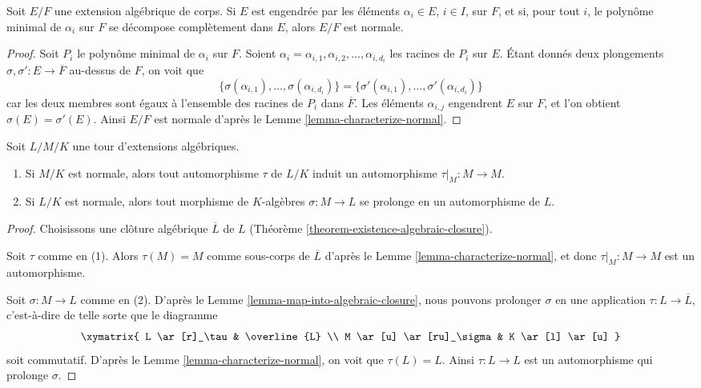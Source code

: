 \begin{lemma}
\label{lemma-normally-generated}
Soit $E/F$ une extension algébrique de corps.
Si $E$ est engendrée par les éléments $\alpha_i \in E$, $i \in I$,
sur $F$, et si, pour tout $i$, le polynôme minimal
de $\alpha_i$ sur $F$ se décompose complètement dans $E$, alors
$E/F$ est normale.
\end{lemma}

\begin{proof}
Soit $P_i$ le polynôme minimal de $\alpha_i$ sur $F$.
Soient $\alpha_i = \alpha_{i, 1}, \alpha_{i, 2}, \ldots, \alpha_{i, d_i}$
les racines de $P_i$ sur $E$. Étant donnés deux plongements
$\sigma, \sigma' : E \to \overline{F}$ au-dessus de $F$, on voit que
$$
\{\sigma(\alpha_{i, 1}), \ldots, \sigma(\alpha_{i, d_i})\} =
\{\sigma'(\alpha_{i, 1}), \ldots, \sigma'(\alpha_{i, d_i})\}
$$
car les deux membres sont égaux à l'ensemble des racines de $P_i$
dans $\overline{F}$. Les éléments $\alpha_{i, j}$
engendrent $E$ sur $F$, et l'on obtient $\sigma(E) = \sigma'(E)$.
Ainsi $E/F$ est normale d'après le Lemme \ref{lemma-characterize-normal}.
\end{proof}

\begin{lemma}
\label{lemma-lift-maps}
Soit $L/M/K$ une tour d'extensions algébriques.
\begin{enumerate}
\item Si $M/K$ est normale, alors tout automorphisme $\tau$ de $L/K$
induit un automorphisme $\tau|_M : M \to M$.
\item Si $L/K$ est normale, alors tout morphisme de $K$-algèbres $\sigma : M \to L$
se prolonge en un automorphisme de $L$.
\end{enumerate}
\end{lemma}

\begin{proof}
Choisissons une clôture algébrique $\overline{L}$ de $L$
(Théorème \ref{theorem-existence-algebraic-closure}).

\medskip\noindent
Soit $\tau$ comme en (1). Alors $\tau(M) = M$ comme sous-corps de $\overline{L}$
d'après le Lemme \ref{lemma-characterize-normal}, et donc
$\tau|_M : M \to M$ est un automorphisme.

\medskip\noindent
Soit $\sigma : M \to L$ comme en (2).
D'après le Lemme \ref{lemma-map-into-algebraic-closure},
nous pouvons prolonger $\sigma$ en une application
$\tau : L \to \overline{L}$, c'est-à-dire de telle sorte que le diagramme
$$
\xymatrix{
L \ar[r]_\tau & \overline{L} \\
M \ar[u] \ar[ru]_\sigma & K \ar[l] \ar[u]
}
$$
soit commutatif. D'après le Lemme \ref{lemma-characterize-normal}, on voit que
$\tau(L) = L$. Ainsi $\tau : L \to L$ est un automorphisme qui
prolonge $\sigma$.
\end{proof}

